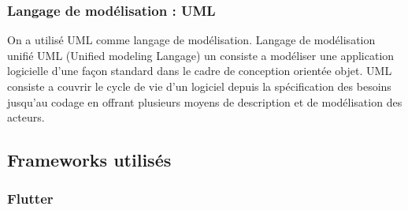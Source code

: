 \subsubsection{Langage de modélisation : UML}

On a utilisé UML comme langage de modélisation.
Langage de modélisation unifié UML (Unified modeling Langage) un
consiste a modéliser une application logicielle d'une façon standard
dans le cadre de conception orientée objet.
UML consiste a couvrir le cycle de vie d'un logiciel depuis la
spécification des besoins jusqu'au codage en offrant plusieurs
moyens de description et de modélisation des acteurs.
\subsection{Frameworks utilisés}

\subsubsection{Flutter}

